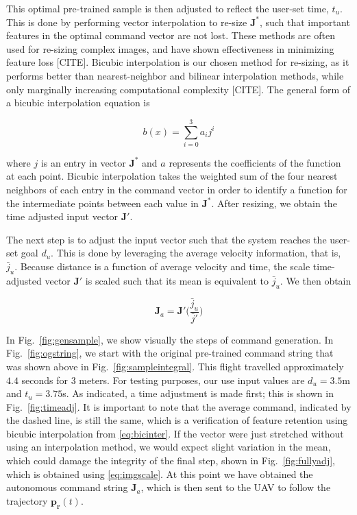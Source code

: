 \documentclass[letterpaper, 10 pt, conference]{ieeeconf}  %
\begin{document}
This optimal pre-trained sample is then adjusted to reflect the user-set time, $t_u$. This is done by performing vector interpolation to re-size $\mathbf{J}^*$, such that important features in the optimal command vector are not lost. These methods are often used for re-sizing complex images, and have shown effectiveness in minimizing feature loss [CITE]. Bicubic interpolation is our chosen method for re-sizing, as it performs better than nearest-neighbor and bilinear interpolation methods, while only marginally increasing computational complexity [CITE]. The general form of a bicubic interpolation equation is 

\begin{equation} \label{eq:bicinter}
    b(x) = \sum_{i=0}^3a_ij^i
\end{equation}

where $j$ is an entry in vector $\mathbf{J}^*$ and $a$ represents the coefficients of the function at each point. Bicubic interpolation takes the weighted sum of the four nearest neighbors of each entry in the command vector in order to identify a function for the intermediate points between each value in $\mathbf{J}^*$. After resizing, we obtain the time adjusted input vector $\mathbf{J}'$.

The next step is to adjust the input vector such that the system reaches the user-set goal $d_u$. This is done by leveraging the average velocity information, that is, $\bar{j}_u$. Because distance is a function of average velocity and time, the scale time-adjusted vector $\mathbf{J}'$ is scaled such that its mean is equivalent to $\bar{j}_u$. We then obtain

\begin{equation} \label{eq:imgscale}
\mathbf{J}_a = \mathbf{J}'\bigg(\frac{\bar{j}_u}{\bar{j}'}\bigg)
\end{equation}

In Fig.~\ref{fig:gensample}, we show visually the steps of command generation. In Fig.~\ref{fig:ogstring}, we start with the original pre-trained command string that was shown above in Fig.~\ref{fig:sampleintegral}. This flight travelled approximately $4.4$ seconds for $3$ meters. For testing purposes, our use input values are $d_u=3.5$m and $t_u=3.75$s. As indicated, a time adjustment is made first; this is shown in Fig.~\ref{fig:timeadj}. It is important to note that the average command, indicated by the dashed line, is still the same, which is a verification of feature retention using bicubic interpolation from \eqref{eq:bicinter}. If the vector were just stretched without using an interpolation method, we would expect slight variation in the mean, which could damage the integrity of the final step, shown in Fig.~\ref{fig:fullyadj}, which is obtained using \eqref{eq:imgscale}. At this point we have obtained the autonomous command string $\mathbf{J}_a$, which is then sent to the UAV to follow the trajectory $\mathbf{p_r}(t)$.
\end{document}
